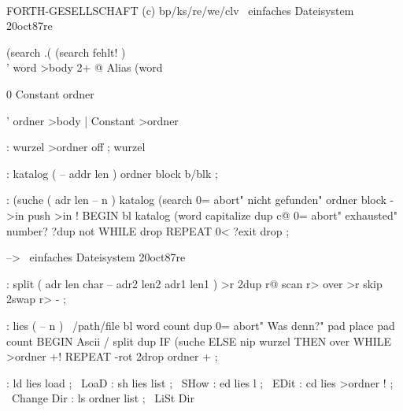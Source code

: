                                          
\\                                       
                                         
FORTH-GESELLSCHAFT  (c) bp/ks/re/we/clv 
\ einfaches Dateisystem        20oct87re 
                                         
\needs (search  .( (search fehlt! ) \\   
                                         
' word >body 2+ @ Alias (word            
                                         
0 Constant ordner                        
                                         
' ordner >body | Constant >ordner        
                                         
: wurzel   >ordner off ; wurzel          
                                         
  : katalog  ( -- addr len )             
 ordner block  b/blk ;                   
                                         
  : (suche  ( adr len -- n )             
 katalog (search                         
 0= abort" nicht gefunden"               
 ordner block -  >in push  >in !         
 BEGIN  bl katalog (word capitalize      
        dup c@ 0= abort" exhausted"      
        number? ?dup not                 
 WHILE  drop  REPEAT  0< ?exit  drop ;   
                                         
-->                                     
\ einfaches Dateisystem        20oct87re 
                                         
: split                                  
 ( adr len char -- adr2 len2 adr1 len1 ) 
 >r 2dup r@ scan  r>                     
 over >r  skip  2swap  r> - ;            
                                         
: lies  ( -- n ) \ /path/file            
 bl word count dup 0= abort" Was denn?"  
 pad place  pad count                    
 BEGIN  Ascii / split                    
  dup IF    (suche                       
      ELSE  nip wurzel  THEN  over       
 WHILE  >ordner +!  REPEAT               
 -rot 2drop ordner + ;                   
                                         
: ld  lies load ;      \ LoaD            
: sh  lies list ;      \ SHow            
: ed  lies l ;         \ EDit            
: cd  lies >ordner ! ; \ Change Dir      
: ls  ordner list ;    \ LiSt Dir        
                                         
